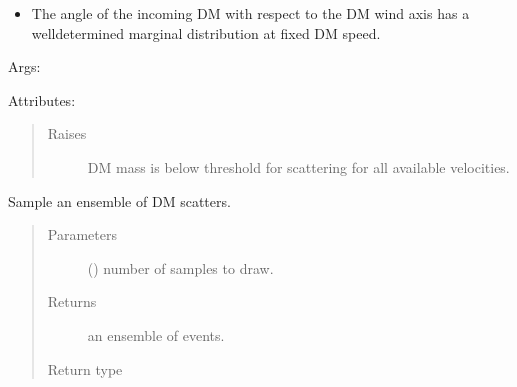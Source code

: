 \documentclass[letterpaper,10pt,english]{sphinxmanual}
\begin{document}
\begin{fulllineitems}
\begin{description}
\begin{enumerate}
\begin{description}
\begin{itemize}
\item {} 
The angle of the incoming DM with respect to the DM wind axis
has a well\sphinxhyphen{}determined marginal distribution at fixed DM speed.

\end{itemize}

\end{description}

\end{enumerate}

\end{description}

Args:

Attributes:
\begin{quote}\begin{description}
\item[{Raises}] \leavevmode
{} \textendash{} DM mass is below threshold for scattering for all
    available velocities.

\end{description}\end{quote}

\begin{fulllineitems}
\label{\detokenize{code_structure:scdc.initial.distribution.integral.InitialSampler.ensemble}}
Sample an ensemble of DM scatters.
\begin{quote}\begin{description}
\item[{Parameters}] \leavevmode
{} () \textendash{} number of samples to draw.

\item[{Returns}] \leavevmode
an ensemble of  events.

\item[{Return type}] \leavevmode
{}

\end{description}\end{quote}

\end{fulllineitems}


\end{fulllineitems}
\end{document}
